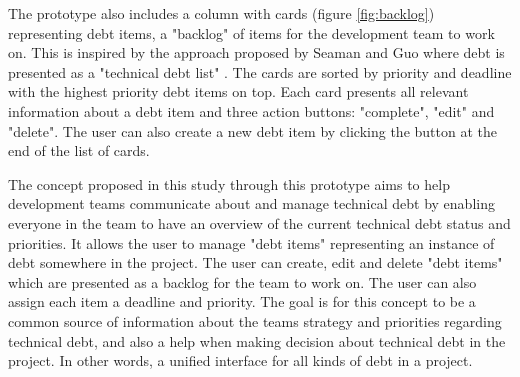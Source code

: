 

The prototype also includes a column with cards (figure \ref{fig:backlog}) representing debt items, a "backlog" of items for the development team to work on. 
This is inspired by the approach proposed by Seaman and Guo where debt is presented as a "technical debt list" \cite{seaman_measuring_2011}.
The cards are sorted by priority and deadline with the highest priority debt items on top.
Each card presents all relevant information about a debt item and three action buttons: "complete", "edit" and "delete".
The user can also create a new debt item by clicking the button at the end of the list of cards.

The concept proposed in this study through this prototype aims to help development teams communicate about and manage technical debt by enabling everyone in the team to have an overview of the current technical debt status and priorities.
It allows the user to manage "debt items" representing an instance of debt somewhere in the project.
The user can create, edit and delete "debt items" which are presented as a backlog for the team to work on.
The user can also assign each item a deadline and priority. 
The goal is for this concept to be a common source of information about the teams strategy and priorities regarding technical debt, and also a help when making decision about technical debt in the project.
In other words, a unified interface for all kinds of debt in a project.